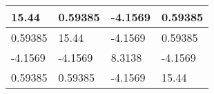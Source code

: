 \begin{tabular}{|l|l|l|l|}
\hline
15.44&0.59385&-4.1569&0.59385\\\hline
0.59385&15.44&-4.1569&0.59385\\\hline
-4.1569&-4.1569&8.3138&-4.1569\\\hline
0.59385&0.59385&-4.1569&15.44\\\hline
\end{tabular}
